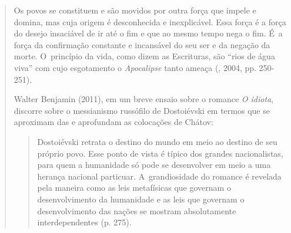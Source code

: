 {\begin{quote}
Os povos se constituem e são movidos por outra força que impele e
domina, mas cuja origem é desconhecida e inexplicável. Essa força é a
força do desejo insaciável de ir até o fim e que ao mesmo tempo nega o
fim. É~a força da confirmação constante e incansável do seu ser e da
negação da morte. O~princípio da vida, como dizem as Escrituras, são
``rios de água viva'' com cujo esgotamento o \emph{Apocalipse} tanto
ameaça (, 2004, pp. 250-251).

Walter Benjamin (2011), em um breve ensaio sobre o romance \emph{O
idiota}, discorre sobre o messianismo russófilo de Dostoiévski em termos
que se aproximam das e aprofundam as colocações de Chátov:

\begin{quote}
Dostoiévski retrata o destino do mundo em meio ao destino de seu próprio
povo. Esse ponto de vista é típico dos grandes nacionalistas, para quem
a humanidade só pode se desenvolver em meio a uma herança nacional
particuar. A~grandiosidade do romance é revelada pela maneira como as
leis metafísicas que governam o desenvolvimento da humanidade e as leis
que governam o desenvolvimento das nações se mostram absolutamente
interdependentes (p. 275).
\end{quote}


\end{quote}}
